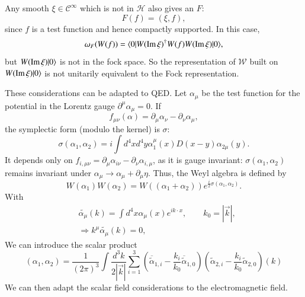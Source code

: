 Any smooth $\xi \in \mathcal{C}^\infty$ which is not in $\mathcal{H}$ also gives an $F$:
\begin{equation}
  F(f)= (\xi, f), \label{chap1-eq2.25}
\end{equation}
since $f$ is a test function and hence compactly supported. In this case,
\begin{equation}
\omega_F (W(f))= \langle 0| W (\operatorname{\mathrm{Im}} \xi)^\dagger W (f)W (\operatorname{\mathrm{Im}} \xi)|0\rangle, \label{chap1-eq2.26}
\end{equation}
but $W (\operatorname{\mathrm{Im}} \xi)|0 \rangle$ is not in the fock space. So the representation of $\mathcal{W}$ built on $W (\operatorname{\mathrm{Im}} \xi)|0 \rangle$ is not unitarily equivalent to the Fock representation.

These considerations can be adapted to QED. Let $\alpha_\mu$ be the test function for the potential in the Lorentz gauge $\partial^\mu \alpha_\mu =0$. If
\begin{equation}
f_{\mu \nu} (\alpha) = \partial_{\mu} \alpha_{\nu}- \partial_\nu \alpha_\mu, \label{chap1-eq-2.27}
\end{equation}
the symplectic form (modulo the kernel) is $\sigma:$
\begin{equation}
  \sigma (\alpha_1, \alpha_2) = i \int d^4 x d^4 y \alpha^\mu_1 (x) D (x-y) \alpha_{2 \mu} (y). \label{chap1-eq2.28}
\end{equation}
It depends only on $f_{i, \mu \nu}= \partial_\mu \alpha_{i \nu}- \partial_\nu \alpha_{i, \mu}$, as it is gauge invariant: $\sigma(\alpha_1, \alpha_2)$ remains invariant under $\alpha_\mu \to \alpha_\mu + \partial_{\mu} \eta$. Thus, the Weyl algebra is defined by
\begin{equation}
W (\alpha_1) W (\alpha_2)= W ((\alpha_1 + \alpha_2)) e^{\frac{i}{2} \sigma(\alpha_1, \alpha_2)}. \label{chap1-eq2.29}
\end{equation}
With
\begin{align}
  &\tilde{\alpha_\mu} (k) = \int d^4 x \alpha_\mu (x)e^{ik\cdot x}, \qquad k_0 = |\overrightarrow{k}|,\label{chap1-eq2.30}\\
  &\Longrightarrow k^{\mu} \tilde{\alpha_\mu} (k)=0,\label{chap1-eq2.31}
\end{align}
We can introduce the scalar product
\begin{equation}
(\alpha_1, \alpha_2)= \frac{1}{(2\pi)^3} \int \frac{d^3 k}{2|\overrightarrow{k}|} \sum^3_{i=1} \left(\overline{\tilde{\alpha}}_{1, i} -  \frac{k_i}{k_0} \overline{\tilde{\alpha}}_{1, 0}\right) (\tilde{\alpha}_{2, i}- \frac{k_i}{k_0} \tilde{\alpha}_{2, 0})(k) \label{chap1-eq2.32}
\end{equation}
We can then adapt the scalar field considerations to the electromagnetic field.

